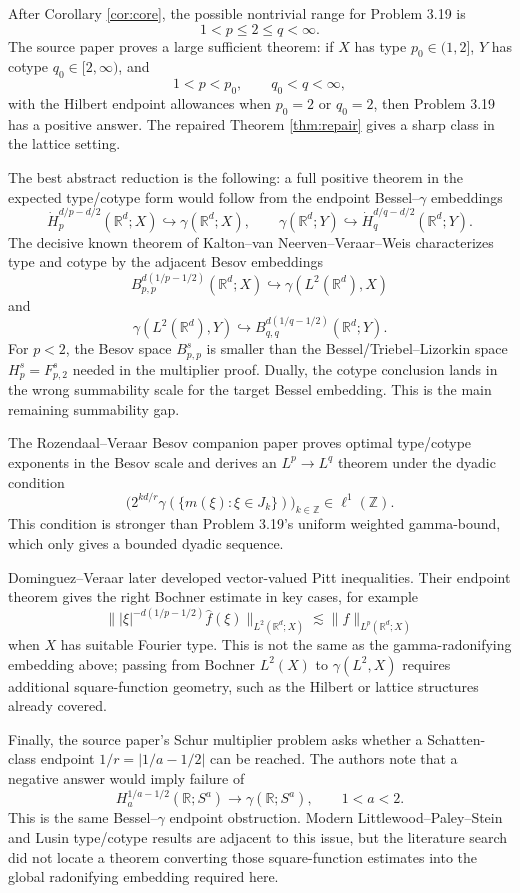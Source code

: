 \documentclass[11pt]{article}
\newcommand{\R}{\mathbb R}
\begin{document}
After Corollary \ref{cor:core}, the possible nontrivial range for Problem 3.19 is
\[
  1<p\le2\le q<\infty.
\]
The source paper proves a large sufficient theorem: if \(X\) has type \(p_0\in(1,2]\), \(Y\) has cotype \(q_0\in[2,\infty)\), and
\[
  1<p<p_0,\qquad q_0<q<\infty,
\]
with the Hilbert endpoint allowances when \(p_0=2\) or \(q_0=2\), then Problem 3.19 has a positive answer.  The repaired Theorem \ref{thm:repair} gives a sharp class in the lattice setting.

The best abstract reduction is the following: a full positive theorem in the expected type/cotype form would follow from the endpoint Bessel--\(\gamma\) embeddings
\[
  \dot H_p^{d/p-d/2}(\R^d;X)\hookrightarrow\gamma(\R^d;X),
  \qquad
  \gamma(\R^d;Y)\hookrightarrow\dot H_q^{d/q-d/2}(\R^d;Y).
\]
The decisive known theorem of Kalton--van Neerven--Veraar--Weis characterizes type and cotype by the adjacent Besov embeddings
\[
  B_{p,p}^{d(1/p-1/2)}(\R^d;X)\hookrightarrow \gamma(L^2(\R^d),X)
\]
and
\[
  \gamma(L^2(\R^d),Y)\hookrightarrow B_{q,q}^{d(1/q-1/2)}(\R^d;Y).
\]
For \(p<2\), the Besov space \(B_{p,p}^s\) is smaller than the Bessel/Triebel--Lizorkin space \(H_p^s=F_{p,2}^s\) needed in the multiplier proof.  Dually, the cotype conclusion lands in the wrong summability scale for the target Bessel embedding.  This is the main remaining summability gap.

The Rozendaal--Veraar Besov companion paper proves optimal type/cotype exponents in the Besov scale and derives an \(L^p\to L^q\) theorem under the dyadic condition
\[
  \big(2^{kd/r}\gamma(\{m(\xi):\xi\in J_k\})\big)_{k\in\mathbb Z}\in\ell^1(\mathbb Z).
\]
This condition is stronger than Problem 3.19's uniform weighted gamma-bound, which only gives a bounded dyadic sequence.

Dominguez--Veraar later developed vector-valued Pitt inequalities.  Their endpoint theorem gives the right Bochner estimate in key cases, for example
\[
  \big\||\xi|^{-d(1/p-1/2)}\widehat f(\xi)\big\|_{L^2(\R^d;X)}
  \lesssim \|f\|_{L^p(\R^d;X)}
\]
when \(X\) has suitable Fourier type.  This is not the same as the gamma-radonifying embedding above; passing from Bochner \(L^2(X)\) to \(\gamma(L^2,X)\) requires additional square-function geometry, such as the Hilbert or lattice structures already covered.

Finally, the source paper's Schur multiplier problem asks whether a Schatten-class endpoint \(1/r=|1/a-1/2|\) can be reached.  The authors note that a negative answer would imply failure of
\[
  H_a^{1/a-1/2}(\R;S^a)\to\gamma(\R;S^a),\qquad 1<a<2.
\]
This is the same Bessel--\(\gamma\) endpoint obstruction.  Modern Littlewood--Paley--Stein and Lusin type/cotype results are adjacent to this issue, but the literature search did not locate a theorem converting those square-function estimates into the global radonifying embedding required here.
\end{document}
